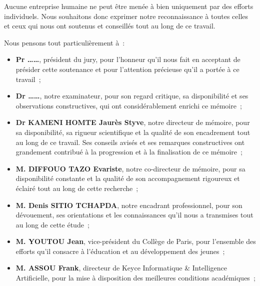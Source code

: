 
Aucune entreprise humaine ne peut être menée à bien uniquement par des efforts
individuels. Nous souhaitons donc exprimer notre reconnaissance à toutes celles
et ceux qui nous ont soutenus et conseillés tout au long de ce travail.

Nous pensons tout particulièrement à~:

\begin{itemize}[itemsep=4pt]
  \item \textbf{Pr \ldots\ldots}, président du jury, pour l'honneur qu'il nous
        fait en acceptant de présider cette soutenance et pour l'attention
        précieuse qu'il a portée à ce travail~;

  \item \textbf{Dr \ldots\ldots}, notre examinateur, pour son regard critique,
        sa disponibilité et ses observations constructives, qui ont
        considérablement enrichi ce mémoire~;

  \item \textbf{Dr KAMENI HOMTE Jaurès Styve}, notre directeur de mémoire, pour
        sa disponibilité, sa rigueur scientifique et la qualité de son
        encadrement tout au long de ce travail. Ses conseils avisés et ses
        remarques constructives ont grandement contribué à la progression et à
        la finalisation de ce mémoire~;

  \item \textbf{M. DIFFOUO TAZO Evariste}, notre co-directeur de mémoire, pour
        sa disponibilité constante et la qualité de son accompagnement
        rigoureux et éclairé tout au long de cette recherche~;

  \item \textbf{M. Denis SITIO TCHAPDA}, notre encadrant professionnel, pour
        son dévouement, ses orientations et les connaissances qu'il nous a
        transmises tout au long de cette étude~;

  \item \textbf{M. YOUTOU Jean}, vice-président du Collège de Paris, pour
        l'ensemble des efforts qu'il consacre à l'éducation et au développement
        des jeunes~;

  \item \textbf{M. ASSOU Frank}, directeur de Keyce Informatique \&
        Intelligence Artificielle, pour la mise à disposition des meilleures
        conditions académiques~;


\end{itemize}
